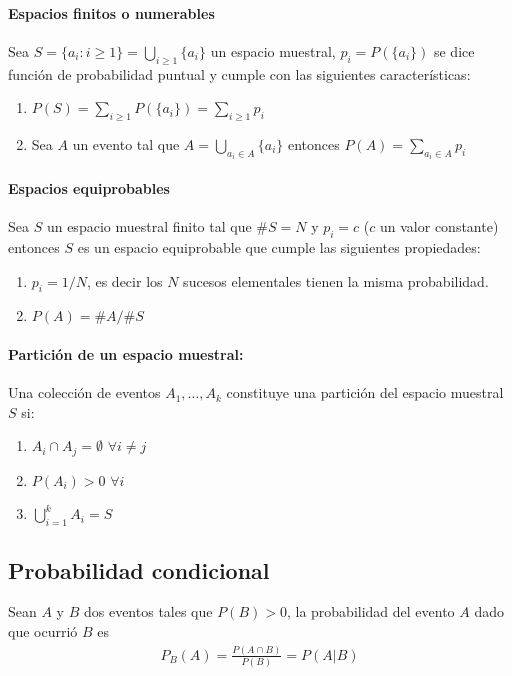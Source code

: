 \paragraph{Espacios finitos o numerables}
Sea $S = \{ a_i : i\geq 1\} = \bigcup_{i\geq 1}\{a_i\}$ un espacio muestral, $p_i = P(\{a_i\})$ se dice función de probabilidad puntual y cumple con las siguientes características:
\begin{enumerate}
\item $P(S) = \sum_{i\geq1}P(\{a_i\}) = \sum_{i\geq1}p_i$
\item Sea $A$ un evento tal que $A = \bigcup_{a_i \in A}\{a_i\}$ entonces $P(A) = \sum_{a_i\in A}p_i$
\end{enumerate}

\paragraph{Espacios equiprobables}
Sea $S$ un espacio muestral finito tal que $\# S=N$ y $p_i = c$ ($c$ un valor constante) entonces $S$ es un espacio equiprobable que cumple las siguientes propiedades:
\begin{enumerate}
\item $p_i = 1/N$, es decir los $N$ sucesos elementales tienen la misma probabilidad.
\item $P(A) = \#A/\#S$
\end{enumerate}

\paragraph{Partición de un espacio muestral:} Una colección de eventos $A_1,\dots,A_k$ constituye una partición del espacio muestral $S$ si:
\begin{enumerate}
\item $A_i\cap A_j = \emptyset$ $\forall i\neq j$
\item $P(A_i) > 0$ $\forall i$ 
\item $\bigcup_{i=1}^k A_i = S$
\end{enumerate}
\subsection{Probabilidad condicional}
Sean $A$ y $B$ dos eventos tales que $P(B)>0$, la probabilidad del evento $A$ dado que ocurrió $B$ es
\begin{align*}
	P_B(A)=\frac{P(A\cap B)}{P(B)} = P(A|B)
\end{align*} 

